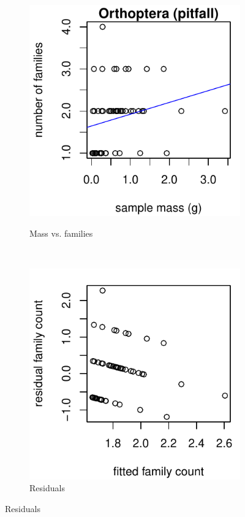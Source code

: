 \documentclass[10pt,letterpaper,twocolumn]{article}
\begin{document}
\begin{figure}[h]
	\centering
	\begin{subfigure}[b]{0.15\textwidth}
		\caption{Mass vs. families}
		\includegraphics[width=\textwidth]{plots/mass-vs-count/scatter/2015_pitfall_Orthoptera_mass-vs-count.pdf}
		\label{fig:pitfall_orthoptera_scatter}
	\end{subfigure}
	~
	\begin{subfigure}[b]{0.15\textwidth}
		\caption{Residuals}
		\includegraphics[width=\textwidth]{plots/mass-vs-count/residual/2015_pitfall_Orthoptera_residual.pdf}

\end{subfigure}
\end{figure}
\end{document}
